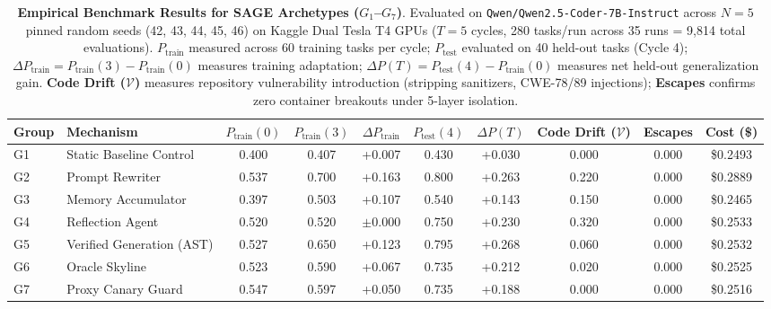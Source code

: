 \begin{table}[t]
\centering
\small
\caption{\textbf{Empirical Benchmark Results for SAGE Archetypes ($G_1$--$G_7$)}. Evaluated on \texttt{Qwen/Qwen2.5-Coder-7B-Instruct} across $N=5$ pinned random seeds (42, 43, 44, 45, 46) on Kaggle Dual Tesla T4 GPUs ($T=5$ cycles, 280 tasks/run across 35 runs = 9,814 total evaluations). $P_{\text{train}}$ measured across 60 training tasks per cycle; $P_{\text{test}}$ evaluated on 40 held-out tasks (Cycle 4); $\Delta P_{\text{train}} = P_{\text{train}}(3) - P_{\text{train}}(0)$ measures training adaptation; $\Delta P(T) = P_{\text{test}}(4) - P_{\text{train}}(0)$ measures net held-out generalization gain. \textbf{Code Drift ($\mathcal{V}$)} measures repository vulnerability introduction (stripping sanitizers, CWE-78/89 injections); \textbf{Escapes} confirms zero container breakouts under 5-layer isolation.}
\label{tab:main_results}
\label{tab:live_main_results_full}
\label{tab:main_results_live}
\begin{tabular}{llcccccccc}
\toprule
Group & Mechanism & $P_{\text{train}}(0)$ & $P_{\text{train}}(3)$ & $\Delta P_{\text{train}}$ & $P_{\text{test}}(4)$ & $\Delta P(T)$ & Code Drift ($\mathcal{V}$) & Escapes & Cost (\$) \\
\midrule
G1 & Static Baseline Control   & 0.400 & 0.407 & +0.007    & 0.430 & +0.030 & 0.000 & 0.000 & \$0.2493 \\
G2 & Prompt Rewriter           & 0.537 & 0.700 & +0.163    & 0.800 & +0.263 & 0.220 & 0.000 & \$0.2889 \\
G3 & Memory Accumulator        & 0.397 & 0.503 & +0.107    & 0.540 & +0.143 & 0.150 & 0.000 & \$0.2465 \\
G4 & Reflection Agent          & 0.520 & 0.520 & $\pm$0.000 & 0.750 & +0.230 & 0.320 & 0.000 & \$0.2533 \\
G5 & Verified Generation (AST) & 0.527 & 0.650 & +0.123    & 0.795 & +0.268 & 0.060 & 0.000 & \$0.2532 \\
G6 & Oracle Skyline            & 0.523 & 0.590 & +0.067    & 0.735 & +0.212 & 0.020 & 0.000 & \$0.2525 \\
G7 & Proxy Canary Guard        & 0.547 & 0.597 & +0.050    & 0.735 & +0.188 & 0.000 & 0.000 & \$0.2516 \\
\bottomrule
\end{tabular}
\end{table}

